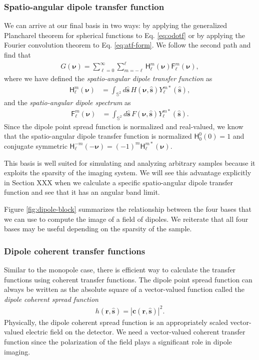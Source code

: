 \documentclass[]{osa-article}
\providecommand{\mb}[1]{\mathbf{#1}}
\providecommand{\msf}[1]{\mathsf{#1}}
\providecommand{\mh}[1]{\mathbf{\hat{#1}}}
\providecommand{\mbb}[1]{\mathbb{#1}}
\providecommand{\bs}[1]{\boldsymbol{#1}}
\providecommand{\lmsum}{\sum_{\ell=0}^\infty\sum_{m=-\ell}^{\ell}}
\begin{document}
\subsubsection{Spatio-angular dipole transfer function}
We can arrive at our final basis in two ways: by applying the generalized
Plancharel theorem for spherical functions to Eq. \ref{eq:odotf} or by applying
the Fourier convolution theorem to Eq. \ref{eq:atf-form}. We follow the
second path and find that
\begin{align}
G(\bs{\nu}) = \lmsum \msf{H}_\ell^m(\bs{\nu})\msf{F}_\ell^m(\bs{\nu}) \label{eq:saft},
\end{align}
where we have defined the \textit{spatio-angular dipole transfer function} as
  \begin{align}
  \msf{H}_\ell^m(\bs{\nu}) &= \int_{\mbb{S}^2}d\mh{s}\, H(\bs{\nu}, \mh{s})Y_\ell^{m*}(\mh{s}),
  \end{align}
  and the \textit{spatio-angular dipole spectrum} as
  \begin{align}
  \msf{F}_\ell^m(\bs{\nu}) &= \int_{\mbb{S}^2}d\mh{s}\, F(\bs{\nu}, \mh{s})Y_\ell^{m*}(\mh{s}).
  \end{align}
  Since the dipole point spread function is normalized and real-valued, we know
  that the spatio-angular dipole transfer function is normalized
  $\msf{H}_0^0(0) = 1$ and conjugate symmetric
  $\msf{H}_\ell^{-m}(-\bs{\nu}) = (-1)^m\msf{H}_\ell^{m*}(\bs{\nu})$.
  
  This basis is well suited for simulating and analyzing arbitrary samples
  because it exploits the sparsity of the imaging system. We will see this
  advantage explicitly in Section XXX when we calculate a specific
  spatio-angular dipole transfer function and see that it has an angular band
  limit.

  Figure \ref{fig:dipole-block} summarizes the relationship between the four
  bases that we can use to compute the image of a field of dipoles. We reiterate
  that all four bases may be useful depending on the sparsity of the sample.
    
\subsubsection{Dipole coherent transfer functions}
Similar to the monopole case, there is efficient way to calculate the transfer
functions using coherent transfer functions. The dipole point spread function
can always be written as the absolute square of a vector-valued function called
the \textit{dipole coherent spread function}
\begin{align}
  h(\mb{r}, \mh{s}) = |\mb{c}(\mb{r}, \mh{s})|^2. \label{eq:absquare2}
\end{align}
Physically, the dipole coherent spread function is an appropriately scaled
vector-valued electric field on the detector. We need a vector-valued coherent
transfer function since the polarization of the field plays a significant role
in dipole imaging.
\end{document}
